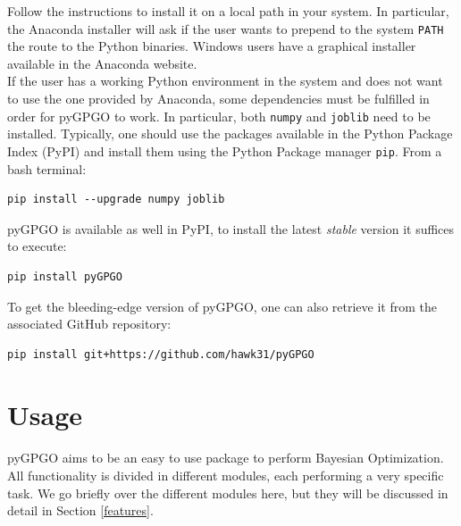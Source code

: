 \documentclass[10pt,a4paper,twoside]{book}
\begin{document}
Follow the instructions to install it on a local path in your system. In particular, the Anaconda installer will ask if the user wants to prepend to the system \texttt{PATH} the route to the Python binaries. Windows users have a graphical installer available in the Anaconda website.\\

If the user has a working Python environment in the system and does not want to use the one provided by Anaconda, some dependencies must be fulfilled in order for pyGPGO to work. In particular, both \texttt{numpy} and \texttt{joblib} need to be installed. Typically, one should use the packages available in the Python Package Index (PyPI) and install them using the Python Package manager \texttt{pip}. From a bash terminal:

\begin{verbatim}
pip install --upgrade numpy joblib            
\end{verbatim}

pyGPGO is available as well in PyPI, to install the latest \textit{stable} version it suffices to execute:
 
\begin{verbatim}
pip install pyGPGO           
\end{verbatim}

To get the bleeding-edge version of pyGPGO, one can also retrieve it from the associated GitHub repository:

\begin{verbatim}
pip install git+https://github.com/hawk31/pyGPGO          
\end{verbatim}

\section{Usage}

pyGPGO aims to be an easy to use package to perform Bayesian Optimization. All functionality is divided in different modules, each performing a very specific task. We go briefly over the different modules here, but they will be discussed in detail in Section \ref{features}.
\end{document}
